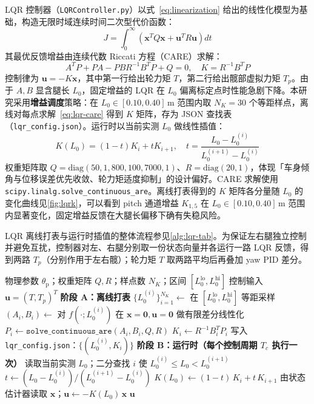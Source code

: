 \documentclass{smbuthesis}
\begin{document}
LQR 控制器（\texttt{LQRController.py}）以式~\eqref{eq:linearization} 给出的线性化模型为基础，构造无限时域连续时间二次型代价函数：
\begin{equation}
\label{eq:lqr-cost}
J = \int_0^\infty \left(\mathbf{x}^T Q \mathbf{x} + \mathbf{u}^T R \mathbf{u}\right)dt
\end{equation}
其最优反馈增益由连续代数 Riccati 方程（CARE）求解：
\begin{equation}
\label{eq:lqr-care}
A^T P + P A - P B R^{-1} B^T P + Q = 0,\quad K = R^{-1} B^T P
\end{equation}
控制律为 $\mathbf{u} = -K\mathbf{x}$，其中第一行给出轮力矩 $T$，第二行给出髋部虚拟力矩 $T_p$。由于 $A, B$ 显含腿长 $L_0$，固定增益的 LQR 在 $L_0$ 偏离标定点时性能急剧下降。本研究采用\textbf{增益调度}策略：在 $L_0 \in [0.10, 0.40]\,\mathrm{m}$ 范围内取 $N_K = 30$ 个等距样点，离线对每点求解~\eqref{eq:lqr-care} 得到 $K$ 矩阵，存为 JSON 查找表（\texttt{lqr\_config.json}）。运行时以当前实测 $L_0$ 做线性插值：
\begin{equation}
\label{eq:lqr-interp}
K(L_0) = (1 - t) K_i + t K_{i+1},\quad t = \frac{L_0 - L_0^{(i)}}{L_0^{(i+1)} - L_0^{(i)}}
\end{equation}
权重矩阵取 $Q = \mathrm{diag}(50, 1, 800, 100, 7000, 1)$、$R = \mathrm{diag}(20, 1)$，体现「车身倾角与位移误差优先收敛、轮力矩适度抑制」的设计偏好。CARE 求解使用 \texttt{scipy.linalg.solve\_continuous\_are}。离线打表得到的 $K$ 矩阵各分量随 $L_0$ 的变化曲线见\cref{fig:lqrk}，可以看到 pitch 通道增益 $K_{1,5}$ 在 $L_0 \in [0.10, 0.40]\,\mathrm{m}$ 范围内显著变化，固定增益反馈在大腿长偏移下确有失稳风险。

LQR 离线打表与运行时插值的整体流程参见\cref{alg:lqr-tab}。为保证左右腿独立控制并避免互扰，控制器对左、右腿分别取一份状态向量并各运行一路 LQR 反馈，得到两路 $T_p$（分别作用于左右髋）；轮力矩 $T$ 取两路平均后再叠加 yaw PID 差分。

\begin{algorithm}[H]
\caption{LQR $K(L_0)$ 离线打表 + 运行时线性插值}\label{alg:lqr-tab}
\begin{algorithmic}[1]
\REQUIRE 物理参数 $\theta_\mathrm{p}$；权重矩阵 $Q, R$；样点数 $N_K$；区间 $[L_0^\mathrm{lo}, L_0^\mathrm{hi}]$
\ENSURE 控制输入 $\mathbf{u} = (T, T_p)^T$
\STATE \textbf{阶段 A：离线打表}
\STATE $\{L_0^{(i)}\}_{i=1}^{N_K} \leftarrow$ 在 $[L_0^\mathrm{lo}, L_0^\mathrm{hi}]$ 等距采样
  \STATE $(A_i, B_i) \leftarrow$ 对 $f(\cdot;L_0^{(i)})$ 在 $\mathbf{x}=\mathbf{0}, \mathbf{u}=\mathbf{0}$ 做有限差分线性化
  \STATE $P_i \leftarrow \mathtt{solve\_continuous\_are}(A_i, B_i, Q, R)$
  \STATE $K_i \leftarrow R^{-1} B_i^T P_i$
\ENDFOR
\STATE 写入 \texttt{lqr\_config.json}：$\{(L_0^{(i)}, K_i)\}$
\STATE \textbf{阶段 B：运行时（每个控制周期 $T_c$ 执行一次）}
\STATE 读取当前实测 $L_0$；二分查找 $i$ 使 $L_0^{(i)} \le L_0 < L_0^{(i+1)}$
\STATE $t \leftarrow (L_0 - L_0^{(i)}) / (L_0^{(i+1)} - L_0^{(i)})$
\STATE $K(L_0) \leftarrow (1-t)\,K_i + t\,K_{i+1}$
\STATE 由状态估计器读取 $\mathbf{x}$；$\mathbf{u} \leftarrow -K(L_0)\,\mathbf{x}$
\RETURN $\mathbf{u}$
\end{algorithmic}
\end{algorithm}
\end{document}
